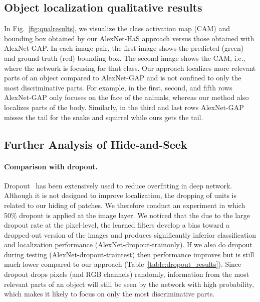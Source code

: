 \subsection{Object localization qualitative results}


In Fig.~\ref{fig:qualresults}, we visualize the class activation map (CAM) and bounding box obtained by our AlexNet-HaS approach versus those obtained with AlexNet-GAP.  In each image pair, the first image shows the predicted (green) and ground-truth (red) bounding box. The second image shows the CAM, i.e., where the network is focusing for that class.  Our approach localizes more relevant parts of an object compared to AlexNet-GAP and is not confined to only the most discriminative parts. For example, in the first, second, and fifth rows AlexNet-GAP only focuses on the face of the animals, whereas our method also localizes parts of the body.  Similarly, in the third and last rows AlexNet-GAP misses the tail for the snake and squirrel while ours gets the tail. 

\subsection{Further Analysis of Hide-and-Seek}


\paragraph{Comparison with dropout.}  Dropout~\cite{srivastava-jmlr2014} has been extensively used to reduce overfitting in deep network.  Although it is not designed to improve localization, the dropping of units is related to our hiding of patches. We therefore conduct an experiment in which 50\% dropout is applied at the image layer. We noticed that the due to the large dropout rate at the pixel-level, the learned filters develop a bias toward a dropped-out version of the images and produces significantly inferior classification and localization performance (AlexNet-dropout-trainonly). If we also do dropout during testing (AlexNet-dropout-traintest) then performance improves but is still much lower compared to our approach (Table~\ref{table:dropout_results}).   Since dropout drops pixels (and RGB channels) randomly, information from the most relevant parts of an object will still be seen by the network with high probability, which makes it likely to focus on only the most discriminative parts.




